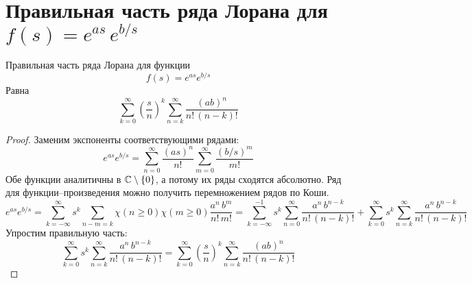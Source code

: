 \section{Правильная часть ряда Лорана для $f(s) = e^{as}\,e^{b/s}$}
\begin{Th*}
Правильная часть ряда Лорана для функции
\[
    f(s) = e^{as}e^{b/s}
\]
Равна
\[
    \sum_{k=0}^{\infty} \left(\frac{s}{n}\right)^k \sum_{n=k}^{\infty} \frac{(ab)^n}{n!\,(n-k)!}
\]
\end{Th*}
\begin{proof}
Заменим экспоненты соответствующими рядами:
\[
    e^{as} e^{b/s} =
%
    \sum_{n=0}^{\infty} \frac{\left(as\right)^n}{n!}
    \sum_{m=0}^{\infty} \frac{\left(b/s\right)^m}{m!}
\]
Обе функции аналитичны в $\mathbb{C} \setminus \{0\}$, а потому их ряды сходятся абсолютно. Ряд для функции--произведения можно получить перемножением рядов по Коши.
\[
    e^{as} e^{b/s} =
%
    \sum_{k=-\infty}^{\infty} s^k \sum_{n-m=k} \chi(n \ge 0) \chi(m \ge 0) \frac{a^n\,b^m}{n!\,m!} =
%
    \sum_{k=-\infty}^{-1} s^k \sum_{n=0}^{\infty} \frac{a^n\,b^{n-k}}{n!\,(n-k)!} +
    \sum_{k=0}^{\infty} s^k \sum_{n=k}^{\infty} \frac{a^n\,b^{n-k}}{n!\,(n-k)!}
\]
Упростим правильную часть:
\[
    \sum_{k=0}^{\infty} s^k \sum_{n=k}^{\infty} \frac{a^n\,b^{n-k}}{n!\,(n-k)!} =
    \sum_{k=0}^{\infty} \left(\frac{s}{n}\right)^k \sum_{n=k}^{\infty} \frac{(ab)^n}{n!\,(n-k)!}
\]
\end{proof}
